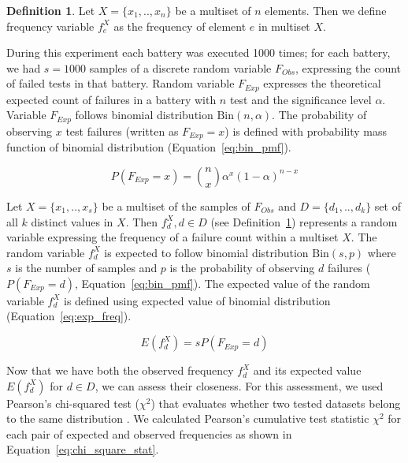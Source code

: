 \documentclass[
	digital,    %
	oneside,
	color,
	11pt,
	nocover,
	notable,
	nolof,
	nolot,
]{fithesis3}
\theoremstyle{definition}
\newtheorem{definition}{Definition}[section]
\theoremstyle{remark}
\begin{document}
\begin{definition}
\label{def:freq}
Let $X = \{x_1, .. ,x_n\}$ be a multiset of $n$ elements. Then we define frequency variable $f_{e}^{X}$ as the frequency of element $e$ in multiset $X$.
\end{definition}

During this experiment each battery was executed 1000 times; for each battery, we had $s = 1000$ samples of a discrete random variable $F_{Obs}$, expressing the count of failed tests in that battery. Random variable $F_{Exp}$ expresses the theoretical expected count of failures in a battery with $n$ test and the significance level $\alpha$. Variable $F_{Exp}$ follows binomial distribution $\text{Bin}(n, \alpha)$. The probability of observing $x$ test failures (written as $F_{Exp} = x$) is defined with probability mass function of binomial distribution (Equation~\ref{eq:bin_pmf}).

\begin{equation}
\label{eq:bin_pmf}
P(F_{Exp} = x) = \binom nx \alpha^x (1-\alpha)^{n-x} 
\end{equation}

Let $X = \{x_1,..,x_s\}$ be a multiset of the samples of $F_{Obs}$ and $D = \{d_1,..,d_k\}$ set of all $k$ distinct values in $X$. Then $f_{d}^{X}, d \in D$ (see Definition~\ref{def:freq}) represents a random variable expressing the frequency of a failure count within a multiset $X$. The random variable $f_{d}^{X}$ is expected to follow binomial distribution $\text{Bin}(s, p)$ where $s$ is the number of samples and $p$ is the probability of observing $d$ failures ($P(F_{Exp} = d)$, Equation~\ref{eq:bin_pmf}). The expected value of the random variable $f_{d}^{X}$ is defined using expected value of binomial distribution (Equation~\ref{eq:exp_freq}).

\begin{equation}
\label{eq:exp_freq}
E\left(f_{d}^{X}\right) = s P(F_{Exp} = d)
\end{equation}

Now that we have both the observed frequency $f_{d}^{X}$ and its expected value $E\left(f_{d}^{X}\right)$ for $d \in D$, we can assess their closeness. For this assessment, we used Pearson's chi-squared test ($\chi^2$) that evaluates whether two tested datasets belong to the same distribution \cite[p.~219]{stat-handbook}. We calculated Pearson's cumulative test statistic $\chi^2$ for each pair of expected and observed frequencies as shown in Equation~\ref{eq:chi_square_stat}.
\end{document}
